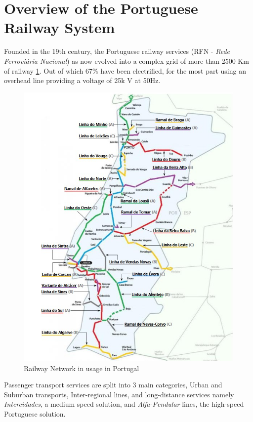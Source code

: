 \section{Overview of the Portuguese Railway System}
Founded in the 19th century, the Portuguese railway services (RFN - \textit{Rede Ferroviária Nacional}) as now evolved into a complex grid of more than 2500 Km of railway \ref{fig:CPLines}. Out of which 67\% have been electrified, for the most part using an overhead line providing a voltage of 25k V at 50Hz. 
\begin{figure}[h]
    \centering
    \includegraphics[scale = 0.5]{Figures/CPLines.jpg}
    \caption{Railway Network in usage in Portugal}
    \label{fig:CPLines}
\end{figure}

Passenger transport services are split into 3 main categories, Urban and Suburban transports, Inter-regional lines, and long-distance services namely \textit{Intercidades}, a medium speed solution, and \textit{Alfa-Pendular} lines, the high-speed Portuguese solution.

